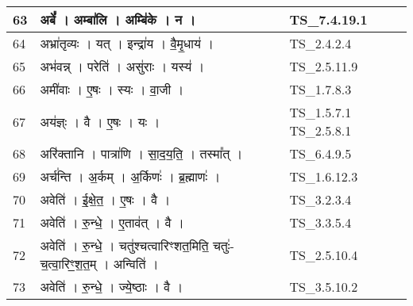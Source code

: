 \documentclass[17pt]{extarticle}
\begin{document}
\begin{longtable}{||p{0.4in}||p{4.9in}||p{0.9in}||}
    \hline
        
    63 & अबें᳚   ।   अम्बा॑लि   ।   अम्बि॑के   ।   न   ।    & TS\_7.4.19.1       \\
    
    \hline
        
    64 & अभ्रा॑तृव्यः   ।   यत्   ।   इन्द्रा॑य   ।   वै॒मृ॒धाय॑   ।    & TS\_2.4.2.4       \\
    
    \hline
        
    65 & अभ॑वन्न्   ।   परेति॑   ।   असु॑राः   ।   यस्य॑   ।    & TS\_2.5.11.9       \\
    
    \hline
        
    66 & अमी॑वाः   ।   ए॒षः   ।   स्यः   ।   वा॒जी   ।    & TS\_1.7.8.3       \\
    
    \hline
        
    67 & अय॑ज्ञ्ः   ।   वै   ।   ए॒षः   ।   यः   ।    & TS\_1.5.7.1 TS\_2.5.8.1       \\
    
    \hline
        
    68 & अरि॑क्तानि   ।   पात्रा॑णि   ।   सा॒द॒य॒ति॒   ।   तस्मा᳚त्   ।    & TS\_6.4.9.5       \\
    
    \hline
        
    69 & अर्च॑न्ति   ।   अ॒र्कम्   ।   अ॒र्किणः॑   ।   ब्र॒ह्माणः॑   ।    & TS\_1.6.12.3       \\
    
    \hline
        
    70 & अवेति॑   ।   ई॒क्षे॒त॒   ।   ए॒षः   ।   वै   ।    & TS\_3.2.3.4       \\
    
    \hline
        
    71 & अवेति॑   ।   रु॒न्धे॒   ।   ए॒ताव॑त्   ।   वै   ।    & TS\_3.3.5.4       \\
    
    \hline
        
    72 & अवेति॑   ।   रु॒न्धे॒   ।   चतु॑श्चत्वारिꣳशत॒मिति॒ चतुः॑{-}च॒त्वा॒रिꣳ॒॒श॒त॒म्   ।   अन्विति॑   ।    & TS\_2.5.10.4       \\
    
    \hline
        
    73 & अवेति॑   ।   रु॒न्धे॒   ।   ज्ये॒ष्ठाः   ।   वै   ।    & TS\_3.5.10.2       \\
    

\end{longtable}
\end{document}
